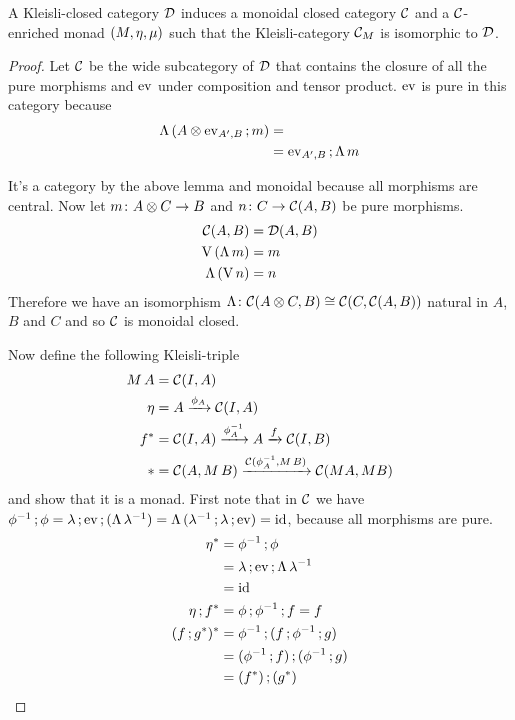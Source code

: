 \documentclass[runningheads,envcountsame]{llncs}
\newcommand{\monad}{M}
\begin{document}
\begin{lemma}
    A Kleisli-closed category $\mathcal{D}$ induces a monoidal closed category $\mathcal{C}$ and a $\mathcal{C}$-enriched monad $(\monad, \munit, \mjoin)$ such that the Kleisli-category $\C_\monad$ is isomorphic to $\mathcal{D}$.
\end{lemma}
\begin{proof}
    Let $\mathcal{C}$ be the wide subcategory of $\mathcal{D}$ that contains the closure of all the pure morphisms and $\eval$ under composition and tensor product. $\eval$ is pure in this category because
    \begin{align}
        \curry\,(\comp{\tensor{A}{\eval_{A', B}}}{m}) &= \\
        &= \comp{\eval_{A', B}}{\curry\,m}
    \end{align}
    
    It's a category by the above lemma and monoidal because all morphisms are central. Now let $m\colon \tensor{A}{C} \to B$ and $n\colon C \to \mathcal{C}(A, B)$ be pure morphisms.
    \begin{align}
        \C(A, B) &= \D(A, B) \\
        \uncurry\,(\curry\,m) &= m \\
        \curry\,(\uncurry\,n) &= n
    \end{align}
    Therefore we have an isomorphism $\curry\colon \C(\tensor{A}{C}, B) \cong \C(C, \C(A, B))$ natural in $A$, $B$ and $C$ and so $\mathcal{C}$ is monoidal closed.
    
    Now define the following Kleisli-triple
    \begin{align}
        M\,A &= \C(I, A) \\
        \munit &= A \xrightarrow{\phi_A} \C(I, A) \\
        f^* &= \C(I, A) \xrightarrow{\phi_A^{-1}} A \xrightarrow{f} \C(I, B) \\
        * &= \C(A, \monad\,B) \xrightarrow{\C(\phi_A^{-1}, \monad\,B)} \C(\monad A, \monad B)
    \end{align}
    and show that it is a monad. First note that in $\mathcal{C}$ we have $\comp{\phi^{-1}}{\phi} = \comp{\comp{\unitl}{\eval}}{(\curry\,\unitl^{-1})} = \curry\,(\comp{\comp{\unitl^{-1}}{\unitl}}{\eval}) = \id$, because all morphisms are pure.
    \begin{align}
        \munit^* &= \comp{\phi^{-1}}{\phi} \\
                 &= \comp{\comp{\unitl}{\eval}}{\curry\,\unitl^{-1}} \\
                 &= \id \\
        \comp{\munit}{f^*} &= \comp{\phi}{\comp{\phi^{-1}}{f}} = f \\
        (\comp{f}{g^*})^* &= \comp{\phi^{-1}}{(\comp{f}{\comp{\phi^{-1}}{g}})} \\
                          &= \comp{(\comp{\phi^{-1}}{f})}{(\comp{\phi^{-1}}{g})} \\
                          &= \comp{(f^*)}{(g^*)}
    \end{align}
    

\end{proof}
\end{document}
